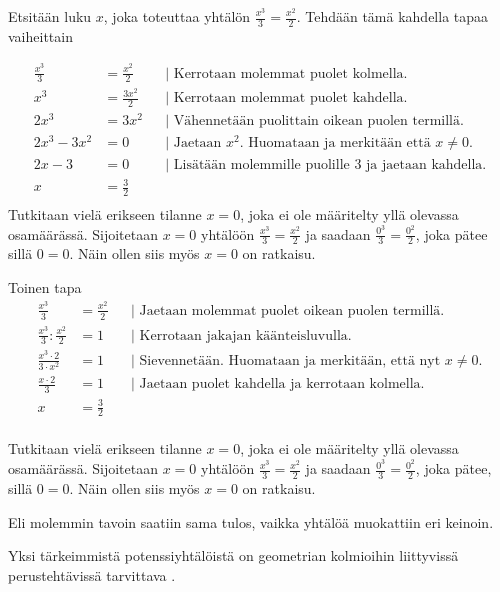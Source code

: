 \begin{esimerkki}
Etsitään luku $x$, joka toteuttaa yhtälön $\frac{x^3}{3}=\frac{x^2}{2}$. Tehdään tämä kahdella tapaa vaiheittain

		\begin{align*}
			\frac{x^3}{3}&=\frac{x^2}{2} && \text{| Kerrotaan molemmat puolet kolmella.} \\
			x^3 &=\frac{3x^2}{2}   && \text{| Kerrotaan molemmat puolet kahdella.} \\
			2x^3 &=3x^2 && \text{| Vähennetään puolittain oikean puolen termillä.} \\
			2x^3 -3x^2&=0 && \text{| Jaetaan $x^2$. Huomataan ja merkitään että $x\neq0$.} \\
			2x -3&=0 && \text{| Lisätään molemmille puolille $3$ ja jaetaan kahdella.} \\ 
			x&=\frac{3}{2} && \\
		\end{align*}
Tutkitaan vielä erikseen tilanne $x=0$, joka ei ole määritelty yllä olevassa osamäärässä. Sijoitetaan $x=0$ yhtälöön $\frac{x^3}{3}=\frac{x^2}{2}$ ja saadaan $\frac{0^3}{3}=\frac{0^2}{2}$, joka pätee sillä $0=0$. Näin ollen siis myös $x=0$ on ratkaisu. 

Toinen tapa
\begin{align*}
\frac{x^3}{3}&=\frac{x^2}{2} && \text{| Jaetaan molemmat puolet oikean puolen termillä. } \\
\frac{x^3}{3}:\frac{x^2}{2}&=1 && \text{| Kerrotaan jakajan käänteisluvulla.} \\
\frac{x^3\cdot2}{3\cdot x^2}&=1 && \text{| Sievennetään. Huomataan ja merkitään, että nyt $x\neq0$.} \\
\frac{x\cdot2}{3}&=1 && \text{| Jaetaan puolet kahdella ja kerrotaan kolmella.} \\
x&=\frac{3}{2} && \\
\end{align*}

Tutkitaan vielä erikseen tilanne $x=0$, joka ei ole määritelty yllä olevassa osamäärässä. Sijoitetaan $x=0$ yhtälöön $\frac{x^3}{3}=\frac{x^2}{2}$ ja saadaan $\frac{0^3}{3}=\frac{0^2}{2}$, joka pätee, sillä $0=0$. Näin ollen siis myös $x=0$ on ratkaisu.

Eli molemmin tavoin saatiin sama tulos, vaikka yhtälöä muokattiin eri keinoin.

\end{esimerkki}

Yksi tärkeimmistä potenssiyhtälöistä on geometrian kolmioihin liittyvissä perustehtävissä tarvittava . %

